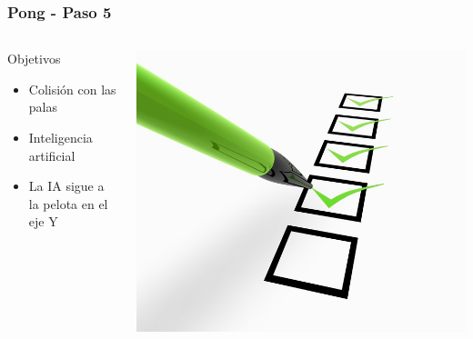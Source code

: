 \begin{frame}
	\frametitle{Pong - Paso 5}
    \begin{columns}[c]
	\column{175pt}
	\begin{block}{Objetivos}
		\begin{itemize}
			\item Colisión con las palas
			\item Inteligencia artificial
			\item La IA sigue a la pelota en el eje Y
		\end{itemize}            
	\end{block}
    
    \column{125pt}
	\begin{center}
		\includegraphics[scale=0.6]{img/checklist.jpg}
	\end{center}	
	
    \end{columns}
\end{frame}

